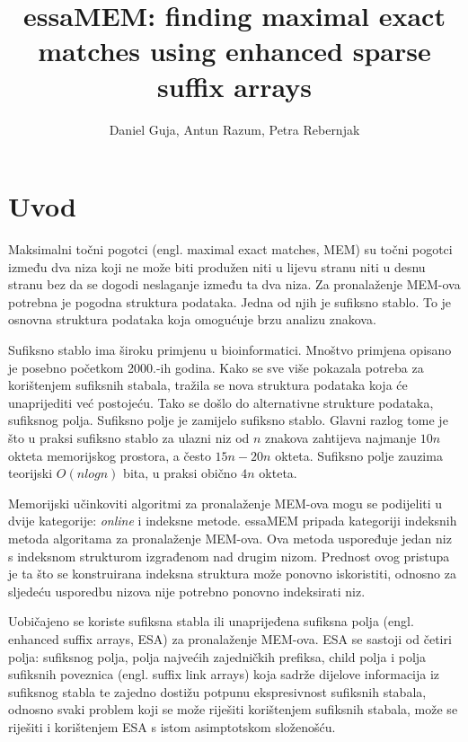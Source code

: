 \documentclass[times, utf8, seminar, numeric]{fer}
\begin{document}
\title{essaMEM: finding maximal exact matches using enhanced sparse suffix arrays}
\author{Daniel Guja, Antun Razum, Petra Rebernjak}

\maketitle
\tableofcontents

\chapter{Uvod}
Maksimalni točni pogotci (engl. maximal exact matches, MEM) su točni pogotci između dva niza koji ne može biti produžen niti u lijevu stranu niti u desnu stranu bez da se dogodi neslaganje između ta dva niza. Za pronalaženje MEM-ova potrebna je pogodna struktura podataka. Jedna od njih je sufiksno stablo. To je osnovna struktura podataka koja omogućuje brzu analizu znakova. 

Sufiksno stablo ima široku primjenu u bioinformatici. Mnoštvo primjena opisano je posebno početkom 2000.-ih godina. Kako se sve više pokazala potreba za korištenjem sufiksnih stabala, tražila se nova struktura podataka koja će unaprijediti već postojeću. Tako se došlo do alternativne strukture podataka, sufiksnog polja. Sufiksno polje je zamijelo sufiksno stablo. Glavni razlog tome je što u praksi sufiksno stablo za ulazni niz od $n$ znakova zahtijeva najmanje $10n$ okteta memorijskog prostora, a često $15n-20n$ okteta. Sufiksno polje zauzima teorijski $O(n log n)$ bita, u praksi obično $4n$ okteta.

Memorijski učinkoviti algoritmi za pronalaženje MEM-ova mogu se podijeliti u dvije kategorije: \textit{online} i indeksne metode. essaMEM pripada kategoriji indeksnih metoda algoritama za pronalaženje MEM-ova. Ova metoda uspoređuje jedan niz s indeksnom strukturom izgrađenom nad drugim nizom. Prednost ovog pristupa je ta što se konstruirana indeksna struktura može ponovno iskoristiti, odnosno za sljedeću usporedbu nizova nije potrebno ponovno indeksirati niz. 

Uobičajeno se koriste sufiksna stabla ili unaprijeđena sufiksna polja (engl. enhanced suffix arrays, ESA) za pronalaženje MEM-ova. ESA se sastoji od četiri polja: sufiksnog polja, polja najvećih zajedničkih prefiksa, child polja i polja sufiksnih poveznica (engl. suffix link arrays) koja sadrže dijelove informacija iz sufiksnog stabla te zajedno dostižu potpunu ekspresivnost sufiksnih stabala, odnosno svaki problem koji se može riješiti korištenjem sufiksnih stabala, može se riješiti i korištenjem ESA s istom asimptotskom složenošću.
\end{document}
